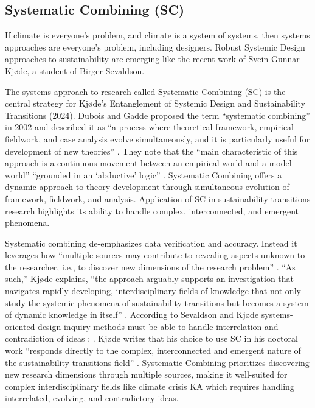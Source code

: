\subsection{Systematic Combining (SC)}
If climate is everyone’s problem, and climate is a system of systems, then systems approaches are everyone’s problem, including designers. Robust Systemic Design approaches to sustainability are emerging like the recent work of Svein Gunnar Kjøde, a student of Birger Sevaldson.

The systems approach to research called Systematic Combining (SC) is the central strategy for Kjøde’s Entanglement of Systemic Design and Sustainability Transitions (2024). Dubois and Gadde proposed the term “systematic combining” in 2002 and described it as “a process where theoretical framework, empirical fieldwork, and case analysis evolve simultaneously, and it is particularly useful for development of new theories” \citep[p. 554]{dubois_systematic_2002}. They note that the “main characteristic of this approach is a continuous movement between an empirical world and a model world” \citep[p. 554]{dubois_systematic_2002} “grounded in an ‘abductive’ logic” \citep[p. 553]{dubois_systematic_2002}. Systematic Combining offers a dynamic approach to theory development through simultaneous evolution of framework, fieldwork, and analysis. Application of SC in sustainability transitions research highlights its ability to handle complex, interconnected, and emergent phenomena.


Systematic combining de-emphasizes data verification and accuracy. Instead it leverages how “multiple sources may contribute to revealing aspects unknown to the researcher, i.e., to discover new dimensions of the research problem” \citep[p. 556]{dubois_systematic_2002}. “As such,” Kjøde explains, “the approach arguably supports an investigation that navigates rapidly developing, interdisciplinary fields of knowledge that not only study the systemic phenomena of sustainability transitions but becomes a system of dynamic knowledge in itself” \citep[p. 46]{kjode_entanglement_2024}. According to Sevaldson and Kjøde systems-oriented design inquiry methods must be able to handle interrelation and contradiction of ideas \citep[p. 46]{kjode_entanglement_2024}; \citep[p. 8]{sevaldson_discussions_2010-1}. Kjøde writes that his choice to use SC in his doctoral work “responds directly to the complex, interconnected and emergent nature of the sustainability transitions field” \citep[p. 45]{kjode_entanglement_2024}. Systematic Combining prioritizes discovering new research dimensions through multiple sources, making it well-suited for complex interdisciplinary fields like climate crisis KA which requires handling interrelated, evolving, and contradictory ideas.


